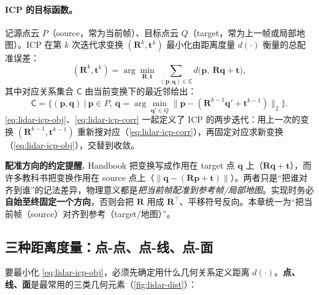 \paragraph{ICP 的目标函数。}
记源点云 $P$（source，常为当前帧）、目标点云 $Q$（target，常为上一帧或局部地图）。ICP 在第 $k$ 次迭代求变换 $(\mathbf{R}^k,\mathbf{t}^k)$ 最小化由距离度量 $d(\cdot)$ 衡量的总配准误差\cite{carlone2026handbook}：
\begin{equation}
  (\mathbf{R}^k,\mathbf{t}^k)=\arg\min_{\mathbf{R},\mathbf{t}}\ \sum_{(\mathbf{p},\mathbf{q})\in\mathsf{C}} d\big(\mathbf{p},\ \mathbf{R}\mathbf{q}+\mathbf{t}\big),
  \label{eq:lidar-icp-obj}
\end{equation}
其中对应关系集合 $\mathsf{C}$ 由当前变换下的最近邻给出：
\begin{equation}
  \mathsf{C}=\Big\{(\mathbf{p},\mathbf{q})\ \Big|\ \mathbf{p}\in P,\ \mathbf{q}=\arg\min_{\mathbf{q}'\in Q}\big\|\mathbf{p}-(\mathbf{R}^{k-1}\mathbf{q}'+\mathbf{t}^{k-1})\big\|_2\Big\}.
  \label{eq:lidar-icp-corr}
\end{equation}
\cref{eq:lidar-icp-obj}、\cref{eq:lidar-icp-corr} 一起定义了 ICP 的两步迭代：用上一次的变换 $(\mathbf{R}^{k-1},\mathbf{t}^{k-1})$ 重新搜对应（\cref{eq:lidar-icp-corr}），再固定对应求新变换（\cref{eq:lidar-icp-obj}），交替到收敛。

\begin{note}
\textbf{配准方向的约定提醒.}\;
Handbook 把变换写成作用在 target 点 $\mathbf{q}$ 上（$\mathbf{R}\mathbf{q}+\mathbf{t}$），而许多教科书把变换作用在 source 点上（$\|\mathbf{q}-(\mathbf{R}\mathbf{p}+\mathbf{t})\|$）。两者只是“把谁对齐到谁”的记法差异，物理意义都是\emph{把当前帧配准到参考帧/局部地图}。实现时务必\textbf{自始至终固定一个方向}，否则会把 $\mathbf{R}$ 用成 $\mathbf{R}^\top$、平移符号反向。本章统一为“把当前帧（source）对齐到参考（target/地图）”。
\end{note}

\subsection{三种距离度量：点-点、点-线、点-面}
\label{sec:lidar-dist}

要最小化 \cref{eq:lidar-icp-obj}，必须先确定用什么几何关系定义距离 $d(\cdot)$。\textbf{点、线、面}是最常用的三类几何元素\cite{carlone2026handbook}（\cref{fig:lidar-dist}）：

